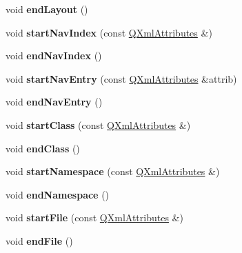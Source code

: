 \begin{DoxyCompactItemize}
void {\bfseries end\+Layout} ()
\item 
\mbox{\label{class_layout_parser_a17a2d4c4d85917fc43d25aaaae562d03}} 
void {\bfseries start\+Nav\+Index} (const \mbox{\hyperlink{class_q_xml_attributes}{Q\+Xml\+Attributes}} \&)
\item 
\mbox{\label{class_layout_parser_ac23ebe1f687d00e2de1afe54e9774d6e}} 
void {\bfseries end\+Nav\+Index} ()
\item 
\mbox{\label{class_layout_parser_ab1c6a6e8435dfac22c988ca0f1f434c3}} 
void {\bfseries start\+Nav\+Entry} (const \mbox{\hyperlink{class_q_xml_attributes}{Q\+Xml\+Attributes}} \&attrib)
\item 
\mbox{\label{class_layout_parser_aeef097868148b046c02b7b2ecdd42e59}} 
void {\bfseries end\+Nav\+Entry} ()
\item 
\mbox{\label{class_layout_parser_a43f4c8089b8a9da04be6cbd17672c69a}} 
void {\bfseries start\+Class} (const \mbox{\hyperlink{class_q_xml_attributes}{Q\+Xml\+Attributes}} \&)
\item 
\mbox{\label{class_layout_parser_aedfb21bc901f880aa359f2c23f82492a}} 
void {\bfseries end\+Class} ()
\item 
\mbox{\label{class_layout_parser_a6fddf2358d18a9caefde0e7e93cdcbd0}} 
void {\bfseries start\+Namespace} (const \mbox{\hyperlink{class_q_xml_attributes}{Q\+Xml\+Attributes}} \&)
\item 
\mbox{\label{class_layout_parser_aadce9f277dc348593d137d06c79ede26}} 
void {\bfseries end\+Namespace} ()
\item 
\mbox{\label{class_layout_parser_ac6a715c3de3c7eb65dded27f7e667489}} 
void {\bfseries start\+File} (const \mbox{\hyperlink{class_q_xml_attributes}{Q\+Xml\+Attributes}} \&)
\item 
\mbox{\label{class_layout_parser_a243a2f6da8f80d564283f569f4d3dad7}} 
void {\bfseries end\+File} ()
\item 

\end{DoxyCompactItemize}
